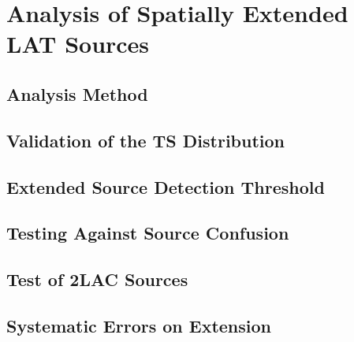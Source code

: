 
\chapter{Analysis of Spatially Extended LAT Sources}


\section{Analysis Method}

\section{Validation of the TS Distribution}

\section{Extended Source Detection Threshold}

\section{Testing Against Source Confusion}

\section{Test of 2LAC Sources}

\section{Systematic Errors on Extension}

